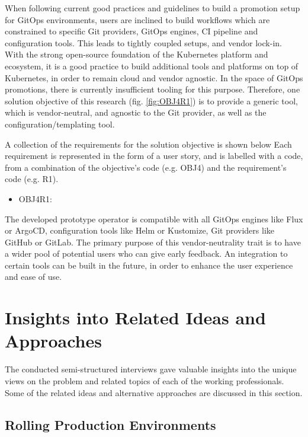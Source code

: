 When following current good practices and guidelines
to build a promotion setup for GitOps environments,
users are inclined to build workflows which are constrained to specific Git providers, GitOps engines,
CI pipeline and configuration tools. This leads to tightly coupled setups,
and vendor lock-in.
With the strong open-source foundation of the Kubernetes platform and ecosystem,
it is a good practice to build additional tools and platforms on top of Kubernetes,
in order to remain cloud and vendor agnostic. In the space of GitOps promotions,
there is currently insufficient tooling for this purpose.
Therefore, one solution objective of this research (fig. \ref{fig:OBJ4R1}) is to
provide a generic tool,
which is vendor-neutral,
and agnostic to the Git provider, as well as the configuration/templating tool.

A collection of the requirements for the solution objective is shown below
Each requirement is represented in the form of a user story,
and is labelled with a code, from a combination of the
objective's code (e.g. OBJ4) and the requirement's code (e.g. R1).

\begin{itemize}
	\item OBJ4R1: 
\end{itemize}

The developed prototype operator is compatible with all GitOps engines
like Flux or ArgoCD, configuration tools like Helm or Kustomize,
Git providers like GitHub or GitLab.
The primary purpose of this vendor-neutrality trait is to
have a wider pool of potential users who can give early feedback.
An integration to certain tools can be built in the future, in order to enhance the user experience and ease of use.






\section{Insights into Related Ideas and Approaches}
\label{insights-related-ideas-approaches}

The conducted semi-structured interviews gave valuable insights into
the unique views on the problem and related topics of each of the working professionals.
Some of the related ideas and alternative approaches are discussed in this section.

\subsection{Rolling Production Environments}

